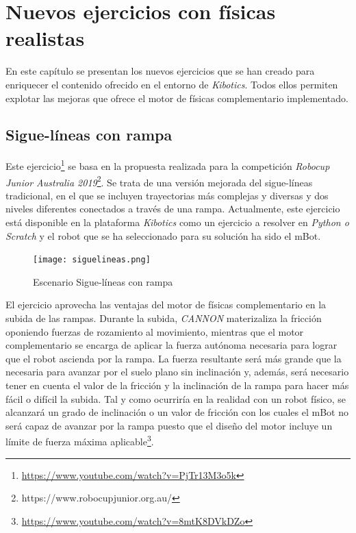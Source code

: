 \chapter{Nuevos ejercicios con físicas realistas}
\label{chap:nuevos_ejercicios} 
En este capítulo se presentan los nuevos ejercicios que se han creado para enriquecer el contenido ofrecido en el entorno de \textit{Kibotics}. Todos ellos permiten explotar las mejoras que ofrece el motor de físicas complementario implementado.

\section{Sigue-líneas con rampa}
Este ejercicio\footnote{\url{https://www.youtube.com/watch?v=PjTr13M3o5k}} se basa en la propuesta realizada para la competición \textit{Robocup Junior Australia 2019}\footnote{https://www.robocupjunior.org.au/}. Se trata de una versión mejorada del sigue-líneas tradicional, en el que se incluyen trayectorias más complejas y diversas y dos niveles diferentes conectados a través de una rampa. Actualmente, este ejercicio está disponible en la plataforma \textit{Kibotics} como un ejercicio a resolver en \textit{Python o Scratch} y el robot que se ha seleccionado para su solución ha sido el mBot.  

\newpage

\begin{figure}[h!]
    \centering
    \texttt{[image: siguelineas.png]}
    \caption{Escenario Sigue-líneas con rampa}
    \label{fig:Sigue-líneas con rampa 2}
\end{figure}

El ejercicio  aprovecha las ventajas del motor de físicas complementario en la subida de las rampas. Durante la subida, \textit{CANNON} materizaliza la fricción oponiendo fuerzas de rozamiento al movimiento, mientras que el motor complementario se encarga de aplicar la fuerza autónoma necesaria para lograr que el robot ascienda por la rampa. La fuerza resultante será más grande que la necesaria para avanzar por el suelo plano sin inclinación y, además, será necesario tener en cuenta el valor de la fricción y la inclinación de la rampa para hacer más fácil o difícil la subida. Tal y como ocurriría en la realidad con un robot físico, se alcanzará un grado de inclinación o un valor de fricción con los cuales el mBot no será capaz de avanzar por la rampa puesto que el diseño del motor incluye un límite de fuerza máxima aplicable\footnote{\url{https://www.youtube.com/watch?v=8mtK8DVkDZo}}.


